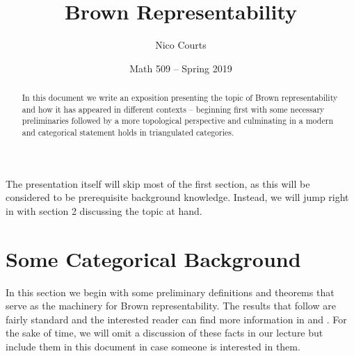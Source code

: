 \documentclass[12pt]{article}
\begin{document}
\title{Brown Representability\vspace{-1ex}}
\author{Nico Courts}
\date{Math 509 -- Spring 2019}
\maketitle

\renewcommand{\abstractname}{Introduction}
\begin{abstract}
  In this document we write an exposition presenting the topic of Brown representability and how it has appeared in different contexts -- beginning first with some necessary preliminaries followed by a more topological perspective and culminating in a modern and categorical statement holds in triangulated categories.
\end{abstract}
\tableofcontents

\newpage
The presentation itself will skip most of the first section, as this will be considered to be prerequisite background knowledge.
Instead, we will jump right in with section 2 discussing the topic at hand.

\section{Some Categorical Background}
In this section we begin with some preliminary definitions and theorems that serve as the machinery for Brown representability. 
The results that follow are fairly standard and the interested reader can find more information in \cite{neeman-book} and \cite{riehl16}.
For the sake of time, we will omit a discussion of these facts in our lecture but include them in this document in case someone is interested in them.
\end{document}
